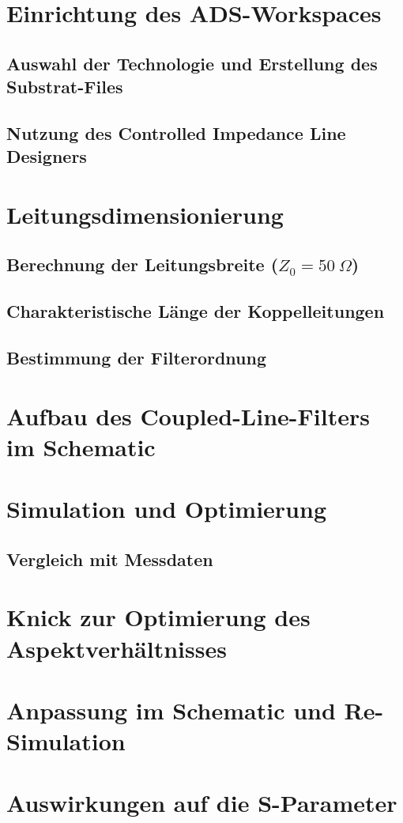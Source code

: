 \section{Einrichtung des ADS-Workspaces}
    \subsection{Auswahl der Technologie und Erstellung des Substrat-Files}
    \subsection{Nutzung des Controlled Impedance Line Designers}

\section{Leitungsdimensionierung}
    \subsection{\texorpdfstring{Berechnung der Leitungsbreite ($Z_0 = 50~\Omega$)}{Berechnung der Leitungsbreite (Z0 = 50 Ohm)}}
    \subsection{Charakteristische Länge der Koppelleitungen}
    \subsection{Bestimmung der Filterordnung}

\section{Aufbau des Coupled-Line-Filters im Schematic}

\section{Simulation und Optimierung}
    \subsection{Vergleich mit Messdaten}

\section{Knick zur Optimierung des Aspektverhältnisses}

\section{Anpassung im Schematic und Re-Simulation}

\section{Auswirkungen auf die S-Parameter}
